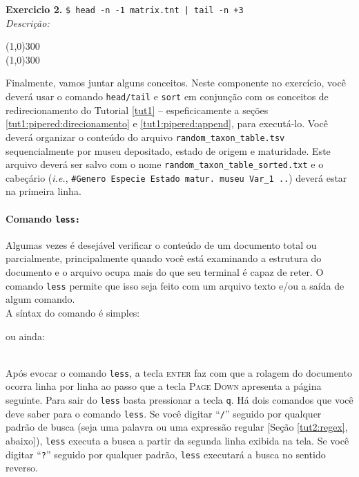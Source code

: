 \begin{refsection}
\begin{blackBlock}{\textbf{Exercicio 2.}}
\texttt{\$ head -n -1 matrix.tnt | tail -n +3}
\\
\textit{Descrição:}
\begin{center}
\line(1,0){300}\\
\line(1,0){300}\\
\end{center}

Finalmente, vamos juntar alguns conceitos. Neste componente no exercício, você deverá usar o comando \texttt{head/tail} e \texttt{sort} em conjunção com os conceitos de redirecionamento do Tutorial \ref{tut1} -- espeficicamente a seções \ref{tut1:pipered:direcionamento} e \ref{tut1:pipered:append}, para executá-lo. Você deverá organizar o conteúdo do arquivo \texttt{random\_taxon\_table.tsv} sequencialmente por museu depositado, estado de origem e maturidade. Este arquivo deverá ser salvo com o nome \texttt{random\_taxon\_table\_sorted.txt} e o cabeçário (\textit{i.e.}, \texttt{\#Genero Especie Estado matur. museu Var\_1 ..}) deverá estar na primeira linha.

\end{blackBlock}

\paragraph{Comando \texttt{less:}}\label{tut2:text:editors:texttools:less}
	Algumas vezes é desejável verificar o conteúdo de um documento total ou parcialmente, principalmente quando você está examinando a estrutura do documento e o arquivo ocupa mais do que seu terminal é capaz de reter. O comando \texttt{less} permite que isso seja feito com um arquivo texto e/ou a saída de algum comando.\\
A síntax do comando é simples:\\

ou ainda:

\\

Após evocar o comando \texttt{less}, a tecla \textsc{enter} faz com que a rolagem do documento ocorra linha por linha ao passo que a tecla \textsc{Page Down} apresenta a página seguinte. Para sair do \texttt{less} basta pressionar a tecla \texttt{q}. Há dois comandos que você deve saber para o comando \texttt{less}. Se você digitar ``\texttt{/}'' seguido por qualquer padrão de busca (seja uma palavra ou uma expressão regular [Seção \ref{tut2:regex}, abaixo]), \texttt{less} executa a busca a partir da segunda linha exibida na tela. Se você digitar ``\texttt{?}'' seguido por qualquer padrão,  \texttt{less} executará a busca no sentido reverso.\\


\end{refsection}
